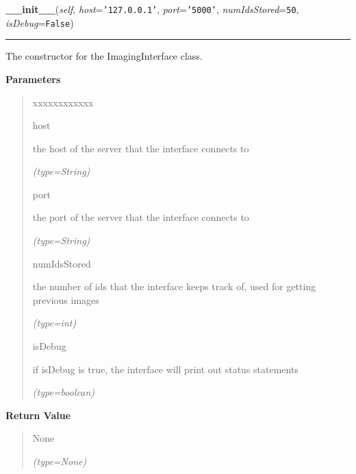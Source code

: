 \hspace{.8\funcindent}\begin{boxedminipage}{\funcwidth}

    \raggedright \textbf{\_\_init\_\_}(\textit{self}, \textit{host}={\tt \texttt{'}\texttt{127.0.0.1}\texttt{'}}, \textit{port}={\tt \texttt{'}\texttt{5000}\texttt{'}}, \textit{numIdsStored}={\tt 50}, \textit{isDebug}={\tt False})

    \vspace{-1.5ex}

    \rule{\textwidth}{0.5\fboxrule}
\setlength{\parskip}{2ex}
    The constructor for the ImagingInterface class.

\setlength{\parskip}{1ex}
      \textbf{Parameters}
      \vspace{-1ex}

      \begin{quote}
        \begin{Ventry}{xxxxxxxxxxxx}

          \item[host]

          the host of the server that the interface connects to

            {\it (type=String)}

          \item[port]

          the port of the server that the interface connects to

            {\it (type=String)}

          \item[numIdsStored]

          the number of ids that the interface keeps track of, used for 
          getting previous images

            {\it (type=int)}

          \item[isDebug]

          if isDebug is true, the interface will print out status 
          statements

            {\it (type=boolean)}

        \end{Ventry}

      \end{quote}

      \textbf{Return Value}
    \vspace{-1ex}

      \begin{quote}
      None

      {\it (type=None)}

      \end{quote}

    \end{boxedminipage}

